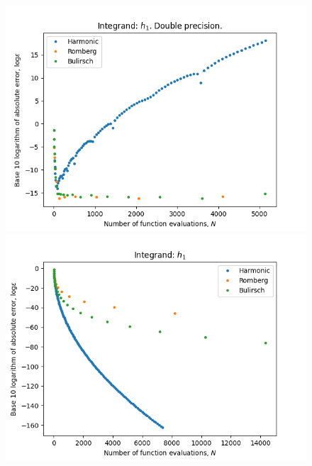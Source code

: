 \begin{figure}[H]
\centering
\begin{minipage}{0.45\textwidth}
\centering
\includegraphics[scale=0.45]{../results/romberg_plots/h_one.png}
\end{minipage}
\begin{minipage}{0.45\textwidth}
\centering
\includegraphics[scale=0.45]{../results/romberg_plots/h_one_hp.png}
\end{minipage}
\end{figure}

